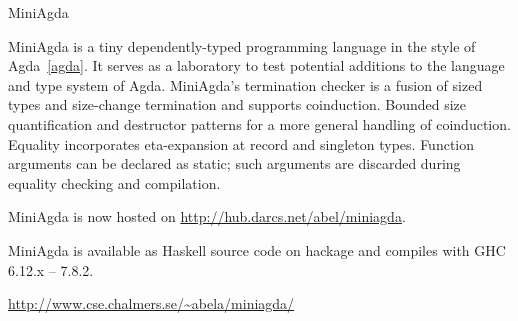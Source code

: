 \begin{hcarentry}{MiniAgda}
\makeheader

MiniAgda is a tiny dependently-typed programming language in the style
of Agda~\cref{agda}. It serves as a laboratory to test 
potential additions to the
language and type system of Agda. MiniAgda's termination checker is a
fusion of sized types and size-change termination and supports
coinduction. Bounded size quantification and destructor
patterns for a more general handling of coinduction.
Equality incorporates eta-expansion at record and
singleton types. Function arguments can be declared as static; such
arguments are discarded during equality checking and compilation.

MiniAgda is now hosted on \url{http://hub.darcs.net/abel/miniagda}.
 
MiniAgda is available as Haskell source code on hackage and compiles with GHC
6.12.x -- 7.8.2. 

\FurtherReading
  \url{http://www.cse.chalmers.se/~abela/miniagda/}
\end{hcarentry}
